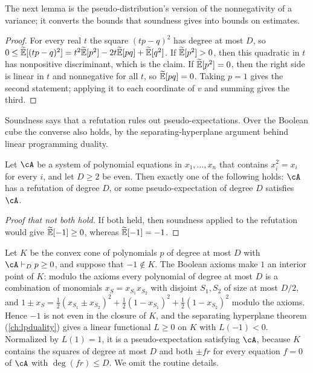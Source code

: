 \begin{refsection}
The next lemma is the pseudo-distribution's version of the nonnegativity of a variance; it converts the bounds that soundness gives into bounds on estimates.


\begin{proof}
For every real $t$ the square $(tp-q)^2$ has degree at most $D$, so $0\le\widetilde{\mathbb{E}}[(tp-q)^2]=t^2\widetilde{\mathbb{E}}[p^2]-2t\widetilde{\mathbb{E}}[pq]+\widetilde{\mathbb{E}}[q^2]$. If $\widetilde{\mathbb{E}}[p^2]>0$, then this quadratic in $t$ has nonpositive discriminant, which is the claim. If $\widetilde{\mathbb{E}}[p^2]=0$, then the right side is linear in $t$ and nonnegative for all $t$, so $\widetilde{\mathbb{E}}[pq]=0$. Taking $p=1$ gives the second statement; applying it to each coordinate of $v$ and summing gives the third.
\end{proof}

Soundness says that a refutation rules out pseudo-expectations. Over the Boolean cube the converse also holds, by the separating-hyperplane argument behind linear programming duality.

\begin{theorem}\label{thm:sos:duality}
Let $\cA$ be a system of polynomial equations in $x_1,\dots,x_n$ that contains $x_i^2=x_i$ for every $i$, and let $D\ge2$ be even. Then exactly one of the following holds: $\cA$ has a refutation of degree $D$, or some pseudo-expectation of degree $D$ satisfies $\cA$.
\end{theorem}

\begin{proof}[Proof that not both hold]
If both held, then soundness applied to the refutation would give $\widetilde{\mathbb{E}}[-1]\ge0$, whereas $\widetilde{\mathbb{E}}[-1]=-1$.
\end{proof}

\begin{proofsketch}
Let $K$ be the convex cone of polynomials $p$ of degree at most $D$ with $\cA\sosProves{D}p\ge0$, and suppose that $-1\notin K$. The Boolean axioms make $1$ an interior point of $K$: modulo the axioms every polynomial of degree at most $D$ is a combination of monomials $x_S=x_{S_1}x_{S_2}$ with disjoint $S_1,S_2$ of size at most $D/2$, and $1\pm x_S=\frac12(x_{S_1}\pm x_{S_2})^2+\frac12(1-x_{S_1})^2+\frac12(1-x_{S_2})^2$ modulo the axioms. Hence $-1$ is not even in the closure of $K$, and the separating hyperplane theorem (\cref{ch:lpduality}) gives a linear functional $L\ge0$ on $K$ with $L(-1)<0$. Normalized by $L(1)=1$, it is a pseudo-expectation satisfying $\cA$, because $K$ contains the squares of degree at most $D$ and both $\pm fr$ for every equation $f=0$ of $\cA$ with $\deg(fr)\le D$. We omit the routine details.
\end{proofsketch}


\end{refsection}
